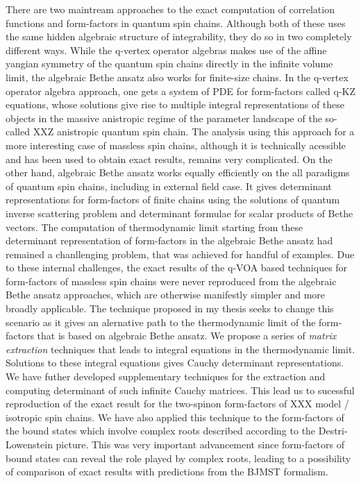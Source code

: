 \documentclass[a4paper, 11pt, DIV=15]{scrarticle}
\begin{document}
There are two maintream approaches to the exact computation of correlation functions and form-factors in quantum spin chains. Although both of these uses the same hidden algebraic structure of integrability, they do so in two completely different ways.
While the q-vertex operator algebras makes use of the affine yangian symmetry of the quantum spin chains directly in the infinite volume limit, the algebraic Bethe ansatz also works for finite-size chains.
In the q-vertex operator algebra approach, one gets a system of PDE for form-factors called q-KZ equations, whose solutions give rise to multiple integral representations of these objects in the massive anistropic regime of the parameter landscape of the so-called XXZ anistropic quantum spin chain. The analysis using this approach for a more interesting case of massless spin chains, although it is technically acessible and has been used to obtain exact results, remains very complicated.
On the other hand, algebraic Bethe ansatz works equally efficiently on the all paradigms of quantum spin chains, including in external field case. It gives determinant representations for form-factors of finite chains using the solutions of quantum inverse scattering problem and determinant formulae for scalar products of Bethe vectors.
The computation of thermodynamic limit starting from these determinant representation of form-factors in the algebraic Bethe ansatz had remained a chanllenging problem, that was achieved for handful of examples.
Due to these internal challenges, the exact results of the q-VOA based techniques for form-factors of massless spin chains were never reproduced from the algebraic Bethe ansatz approaches, which are otherwise manifestly simpler and more broadly applicable.
The technique proposed in my thesis seeks to change this scenario as it gives an alernative path to the thermodynamic limit of the form-factors that is based on algebraic Bethe ansatz.
We propose a series of \textit{matrix extraction} techniques that leads to integral equations in the thermodynamic limit. Solutions to these integral equations gives Cauchy determinant representations. We have futher developed supplementary techniques for the extraction and computing determinant of such infinite Cauchy matrices.
This lead us to sucessful reproduction of the exact result for the two-spinon form-factors of XXX model / isotropic spin chains.
We have also applied this technique to the form-factors of the bound states which involve complex roots described according to the Destri-Lowenstein picture.
This was very important advancement since form-factors of bound states can reveal the role played by complex roots, leading to a possibility of comparison of exact results with predictions from the BJMST formalism.
\end{document}
